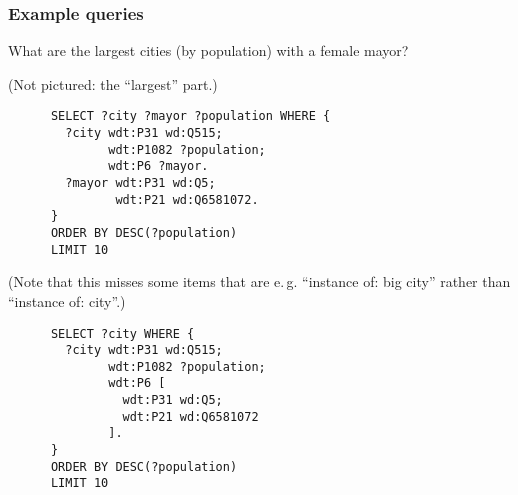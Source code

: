 \documentclass[aspectratio=169]{beamer}
\begin{document}
\begin{frame}[fragile]
  \frametitle{Example queries}
  What are the largest cities (by population) with a female mayor?

  \begin{overprint}

    (Not pictured: the “largest” part.)
  
    \begin{lstlisting}
      SELECT ?city ?mayor ?population WHERE {
        ?city wdt:P31 wd:Q515;
              wdt:P1082 ?population;
              wdt:P6 ?mayor.
        ?mayor wdt:P31 wd:Q5;
               wdt:P21 wd:Q6581072.
      }
      ORDER BY DESC(?population)
      LIMIT 10
    \end{lstlisting}
    (Note that this misses some items that are e.\,g. “instance of: big city” rather than “instance of: city”.)
  
    \begin{lstlisting}
      SELECT ?city WHERE {
        ?city wdt:P31 wd:Q515;
              wdt:P1082 ?population;
              wdt:P6 [
                wdt:P31 wd:Q5;
                wdt:P21 wd:Q6581072
              ].
      }
      ORDER BY DESC(?population)
      LIMIT 10
    \end{lstlisting}
  \end{overprint}
\end{frame}
\end{document}
